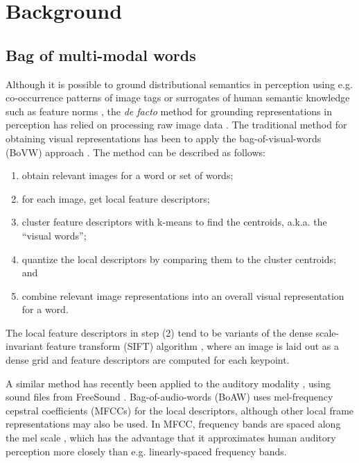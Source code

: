 \documentclass[11pt]{article}
\begin{document}
\section{Background}

\subsection{Bag of multi-modal words}

Although it is possible to ground distributional semantics in perception using e.g. co-occurrence patterns of image tags \cite{Baroni:2008ijl} or surrogates of human semantic knowledge such as feature norms \cite{Andrews:2009pr}, the \emph{de facto} method for grounding representations in perception has relied on processing raw image data \cite{Baroni:2016compass}. The traditional method for obtaining visual representations \cite{Feng:2010naacl,Leong:2011ijcnlp,Bruni:2011gems} has been to apply the bag-of-visual-words (BoVW) approach \cite{Sivic:2003iccv}. The method can be described as follows:

\begin{enumerate}
\item obtain relevant images for a word or set of words;
\vspace{-10pt}
\item for each image, get local feature descriptors;
\vspace{-10pt}
\item cluster feature descriptors with k-means to find the centroids, a.k.a. the ``visual words'';
\vspace{-10pt}
\item quantize the local descriptors by comparing them to the cluster centroids; and
\vspace{-10pt}
\item combine relevant image representations into an overall visual representation for a word.
\end{enumerate}

The local feature descriptors in step (2) tend to be variants of the dense scale-invariant feature transform (SIFT) algorithm \cite{Lowe:2004ijcv}, where an image is laid out as a dense grid and feature descriptors are computed for each keypoint.

A similar method has recently been applied to the auditory modality \cite{Lopopolo:2015iwcs,Kiela:2015emnlpa}, using sound files from FreeSound \cite{Font:2013acm}. Bag-of-audio-words (BoAW) uses mel-frequency cepstral coefficients (MFCCs) \cite{o1987speech} for the local descriptors, although other local frame representations may also be used. In MFCC, frequency bands are spaced along the mel scale \cite{Stevens:1937}, which has the advantage that it approximates human auditory perception more closely than e.g. linearly-spaced frequency bands.
\end{document}
